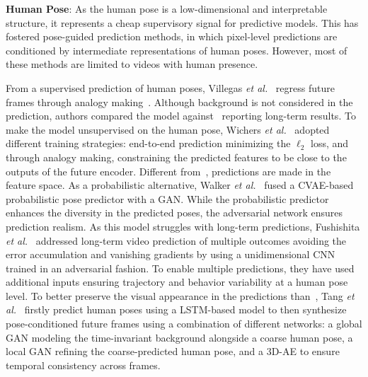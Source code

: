 \vspace*{0.1cm}\noindent\textbf{Human Pose}: As the human pose is a low-dimensional and interpretable structure, it represents a cheap supervisory signal for predictive models. This has fostered pose-guided prediction methods, in which pixel-level predictions are conditioned by intermediate representations of human poses. However, most of these methods are limited to videos with human presence.

From a supervised prediction of human poses, Villegas \textit{et al.}~\cite{Villegas2017} regress future frames through analogy making~\cite{Reed2015}. Although background is not considered in the prediction, authors compared the model against~\cite{Shi2015,Mathieu2016} reporting long-term results. To make the model unsupervised on the human pose, Wichers \textit{et al.}~\cite{Wichers2018} adopted different training strategies: end-to-end prediction minimizing the $\ell_2$ loss, and through analogy making, constraining the predicted features to be close to the outputs of the future encoder. Different from~\cite{Villegas2017}, predictions are made in the feature space. As a probabilistic alternative, Walker \textit{et al.}~\cite{Walker2017} fused a \ac{CVAE}-based probabilistic pose predictor with a \ac{GAN}. While the probabilistic predictor enhances the diversity in the predicted poses, the adversarial network ensures prediction realism. As this model struggles with long-term predictions, Fushishita \textit{et al.}~\cite{Fushishita2019} addressed long-term video prediction of multiple outcomes avoiding the error accumulation and vanishing gradients by using a unidimensional \ac{CNN} trained in an adversarial fashion. To enable multiple predictions, they have used additional inputs ensuring trajectory and behavior variability at a human pose level. To better preserve the visual appearance in the predictions than~\cite{Lee2018,Villegas2017a,Villegas2017}, Tang \textit{et al.}~\cite{Tang2019} firstly predict human poses using a \ac{LSTM}-based model to then synthesize pose-conditioned future frames using a combination of different networks: a global \ac{GAN} modeling the time-invariant background alongside a coarse human pose, a local \ac{GAN} refining the coarse-predicted human pose, and a 3D-\ac{AE} to ensure temporal consistency across frames. 

